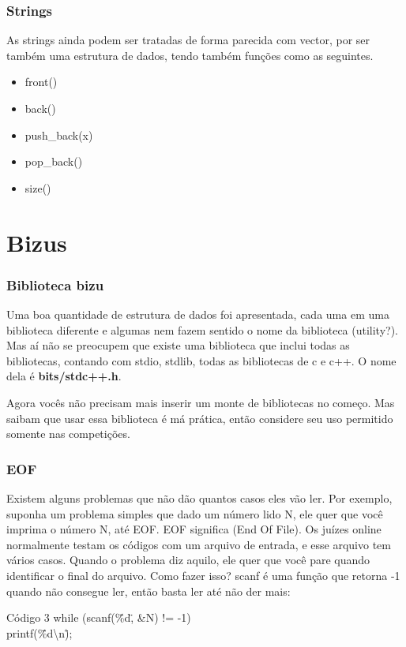 \documentclass{beamer}
\begin{document}
	\begin{frame}
	\frametitle{Strings}
	As strings ainda podem ser tratadas de forma parecida com vector, por
	ser também uma estrutura de dados, tendo também funções como as seguintes.\par
	\begin{itemize}
	\item front()
	\item back()
	\item push\_back(x)
	\item pop\_back()
	\item size()
	\end{itemize}
	\end{frame}


\section{Bizus}

	\begin{frame}
	\frametitle{Biblioteca bizu}
	Uma boa quantidade de estrutura de dados foi apresentada, cada uma
	em uma biblioteca diferente e algumas nem fazem sentido o nome da biblioteca
	(utility?). Mas aí não se preocupem que existe uma biblioteca que inclui todas
	as bibliotecas, contando com stdio, stdlib, todas as bibliotecas de c e c++.
	O nome dela é \textbf{bits/stdc++.h}. \par
	Agora vocês não precisam mais inserir um monte de bibliotecas no começo. Mas
	saibam que usar essa biblioteca é má prática, então considere seu uso permitido
	somente nas competições.
	\end{frame}

	\begin{frame}
	\frametitle{EOF}
		Existem alguns problemas que não dão quantos casos eles vão ler.
		Por exemplo, suponha um problema simples que dado um número lido N,
		ele quer que você imprima o número N, até EOF. EOF significa (End Of File).
		Os juízes online normalmente testam os códigos com um arquivo de entrada,
		e esse arquivo tem vários casos. Quando o problema diz aquilo, ele quer
		que você pare quando identificar o final do arquivo. Como fazer isso? scanf é
		uma função que retorna -1 quando não consegue ler, então basta ler até não der
		mais:
	\begin{block}{Código 3}
		\hspace{10 pt} while (scanf(\"\%d\", \&N) != -1)\\
		\hspace{14 pt} printf(\"\%d\textbackslash n\");\\
	\end{block}
	\end{frame}
\end{document}
